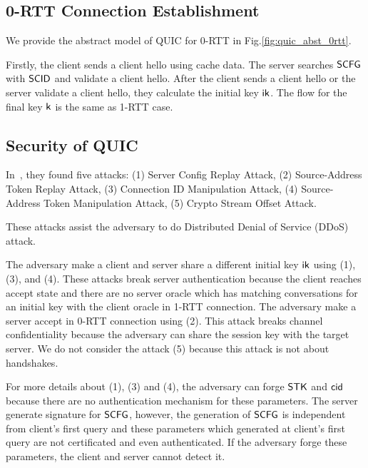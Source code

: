 \subsection{0-RTT Connection Establishment} \label{sec:quic_0rtt}

We provide the abstract model of QUIC for 0-RTT in
Fig.\ref{fig:quic_abst_0rtt}.

%

%
Firstly, the client sends a client hello using cache data.
The server searches $\mathsf{SCFG}$ with $\mathsf{SCID}$ and validate a
client hello.
After the client sends a client hello or the server validate
a client hello, they calculate the initial key $\mathsf{ik}$.
The flow for the final key $\mathsf{k}$ is the same as
1-RTT case.


\subsection{Security of QUIC} \label{sec:quic_detail}

In~\cite{LJBN15:QUIC}, they found five attacks:
(1) Server Config Replay Attack,
(2) Source-Address Token Replay Attack,
(3) Connection ID Manipulation Attack,
(4) Source-Address Token Manipulation Attack,
(5) Crypto Stream Offset Attack.

These attacks assist the adversary to do Distributed Denial of Service
(DDoS) attack.

The adversary make a client and server share a different
initial key $\mathsf{ik}$ using (1), (3), and (4).
These attacks break server authentication because the client
reaches accept state and there are no server oracle which has
matching conversations for an initial key with the client oracle in 1-RTT connection.
The adversary make a server accept in 0-RTT connection
using (2).
This attack breaks channel confidentiality because the adversary
can share the session key with the target server.
We do not consider the attack (5) because this attack is not
about handshakes.

For more details about (1), (3) and (4), the adversary can forge
$\mathsf{STK}$ and $\mathsf{cid}$ because there are no authentication mechanism
for these parameters.
The server generate signature for $\mathsf{SCFG}$, however, the generation
of $\mathsf{SCFG}$ is independent from client's first query and these parameters
which generated at client's first query
are not certificated and even authenticated.
If the adversary forge these parameters, the client and server cannot
detect it.

